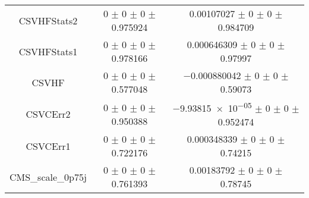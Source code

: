 \begin{table}
\begin{tabular}{ccc}
CSVHFStats2 	& \num{0} $\pm$ \num{0} $\pm$ \num{0} $\pm$ \num{0.975924} 	& \num{0.00107027} $\pm$ \num{0} $\pm$ \num{0} $\pm$ \num{0.984709}\\
CSVHFStats1 	& \num{0} $\pm$ \num{0} $\pm$ \num{0} $\pm$ \num{0.978166} 	& \num{0.000646309} $\pm$ \num{0} $\pm$ \num{0} $\pm$ \num{0.97997}\\
CSVHF 	& \num{0} $\pm$ \num{0} $\pm$ \num{0} $\pm$ \num{0.577048} 	& \num{-0.000880042} $\pm$ \num{0} $\pm$ \num{0} $\pm$ \num{0.59073}\\
CSVCErr2 	& \num{0} $\pm$ \num{0} $\pm$ \num{0} $\pm$ \num{0.950388} 	& \num{-9.93815e-05} $\pm$ \num{0} $\pm$ \num{0} $\pm$ \num{0.952474}\\
CSVCErr1 	& \num{0} $\pm$ \num{0} $\pm$ \num{0} $\pm$ \num{0.722176} 	& \num{0.000348339} $\pm$ \num{0} $\pm$ \num{0} $\pm$ \num{0.74215}\\
CMS\_scale\_0p75j 	& \num{0} $\pm$ \num{0} $\pm$ \num{0} $\pm$ \num{0.761393} 	& \num{0.00183792} $\pm$ \num{0} $\pm$ \num{0} $\pm$ \num{0.78745}\\
\bottomrule
\end{tabular}
\end{table}